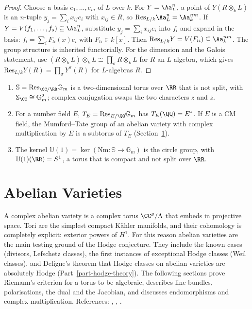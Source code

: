 \begin{proof}
Choose a basis $e_1, \ldots, e_m$ of $L$ over $k$. For $Y = \Aa^n_L$, a point of $Y(R \otimes_kL)$ is an $n$-tuple $y_j = \sum_ix_{ij}e_i$ with $x_{ij} \in R$, so
$\mathrm{Res}_{L/k}\Aa^n_L = \Aa^{nm}_k$. If $Y = V(f_1, \ldots, f_s) \subseteq \Aa^n_L$, substitute $y_j = \sum_ix_{ij}e_i$ into $f_l$ and expand in the basis:
$f_l = \sum_iF_{li}(x)e_i$ with $F_{li} \in k[x]$. Then $\mathrm{Res}_{L/k}Y = V(F_{li}) \subseteq \Aa^{nm}_k$. The group structure is inherited functorially. For the dimension and the
Galois statement, use $(R \otimes_kL) \otimes_kL \cong \prod_\sigma R \otimes_kL$ for $R$ an $L$-algebra, which gives
$\mathrm{Res}_{L/k}Y(R) = \prod_\sigma Y^\sigma(R)$ for $L$-algebras $R$.
\end{proof}

\begin{example}\label{algebraic-groups:example-weil-restriction}
\begin{enumerate}
\item $\mathbb{S} = \mathrm{Res}_{\CC/\RR}\mathbb{G}_m$ is a two-dimensional torus over $\RR$ that is not split, with $\mathbb{S}_\CC \cong \mathbb{G}_m^2$; complex conjugation swaps the two
characters $z$ and $\bar z$.
\item For a number field $E$, $T_E = \mathrm{Res}_{E/\QQ}\mathbb{G}_m$ has $T_E(\QQ) = E^*$. If $E$ is a CM field, the Mumford--Tate group of an abelian variety with complex
multiplication by $E$ is a subtorus of $T_E$ (Section~\ref{algebraic-groups:section-abelian-varieties}).
\item The kernel $\mathbb{U}(1) = \ker(\mathrm{Nm} \colon \mathbb{S} \to \mathbb{G}_m)$ is the circle group, with $\mathbb{U}(1)(\RR) = S^1$, a torus that is compact and not split over $\RR$.
\end{enumerate}
\end{example}

\section{Abelian Varieties}\label{algebraic-groups:section-abelian-varieties}
A complex abelian variety is a complex torus $\CC^g/\Lambda$ that embeds in projective space. Tori are the simplest compact K\"ahler manifolds, and their
cohomology is completely explicit: exterior powers of $H^1$. For this reason abelian varieties are the main testing ground of the Hodge conjecture. They
include the known cases (divisors, Lefschetz classes), the first instances of exceptional Hodge classes (Weil classes), and Deligne's theorem that Hodge classes
on abelian varieties are absolutely Hodge (Part~\ref{part-hodge-theory}). The following sections prove Riemann's criterion for a torus to be algebraic, describes line
bundles, polarisations, the dual and the Jacobian, and discusses endomorphisms and complex multiplication. References: \cite{birkenhake-lange},
\cite{mumford-abelian}, \cite[Chapter 2, Section 6]{griffiths-harris}.

